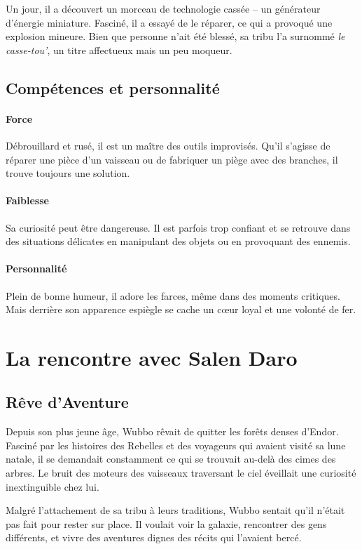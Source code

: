\documentclass[a4paper,9pt,twoside,twocolumn,openany]{book}
\begin{document}
Un jour, il a découvert un morceau de technologie cassée – un générateur d’énergie miniature. Fasciné, il a essayé de le réparer, ce qui a provoqué une explosion mineure. Bien que personne n’ait été blessé, sa tribu l’a surnommé \emph{le casse-tou'}, un titre affectueux mais un peu moqueur.

\subsection{Compétences et personnalité}

\paragraph{Force} Débrouillard et rusé, il est un maître des outils improvisés.
Qu’il s’agisse de réparer une pièce d’un vaisseau ou de fabriquer un piège avec des branches, il trouve toujours une solution.

\paragraph{Faiblesse} Sa curiosité peut être dangereuse.
Il est parfois trop confiant et se retrouve dans des situations délicates en manipulant des objets ou en provoquant des ennemis.

\paragraph{Personnalité} Plein de bonne humeur, il adore les farces, même dans des moments critiques.
Mais derrière son apparence espiègle se cache un cœur loyal et une volonté de fer.

\section{La rencontre avec Salen Daro}

\subsection{Rêve d'Aventure}
Depuis son plus jeune âge, Wubbo rêvait de quitter les forêts denses d’Endor. Fasciné par les histoires des Rebelles et des voyageurs qui avaient visité sa lune natale, il se demandait constamment ce qui se trouvait au-delà des cimes des arbres. Le bruit des moteurs des vaisseaux traversant le ciel éveillait une curiosité inextinguible chez lui.

Malgré l’attachement de sa tribu à leurs traditions, Wubbo sentait qu’il n’était pas fait pour rester sur place. Il voulait voir la galaxie, rencontrer des gens différents, et vivre des aventures dignes des récits qui l’avaient bercé.
\end{document}
